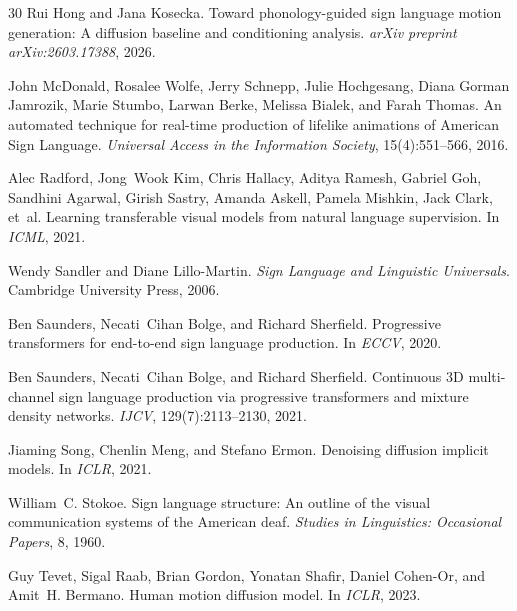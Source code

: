 \documentclass{article}
\begin{document}
\begin{thebibliography}{30}
Rui Hong and Jana Kosecka.
\newblock Toward phonology-guided sign language motion generation: A diffusion baseline and conditioning analysis.
\newblock \emph{arXiv preprint arXiv:2603.17388}, 2026.

John McDonald, Rosalee Wolfe, Jerry Schnepp, Julie Hochgesang, Diana Gorman Jamrozik, Marie Stumbo, Larwan Berke, Melissa Bialek, and Farah Thomas.
\newblock An automated technique for real-time production of lifelike animations of {A}merican {S}ign {L}anguage.
\newblock \emph{Universal Access in the Information Society}, 15(4):551--566, 2016.

Alec Radford, Jong~Wook Kim, Chris Hallacy, Aditya Ramesh, Gabriel Goh, Sandhini Agarwal, Girish Sastry, Amanda Askell, Pamela Mishkin, Jack Clark, et~al.
\newblock Learning transferable visual models from natural language supervision.
\newblock In \emph{ICML}, 2021.

Wendy Sandler and Diane Lillo-Martin.
\newblock \emph{Sign Language and Linguistic Universals}.
\newblock Cambridge University Press, 2006.

Ben Saunders, Necati~Cihan Bolge, and Richard Sherfield.
\newblock Progressive transformers for end-to-end sign language production.
\newblock In \emph{ECCV}, 2020.

Ben Saunders, Necati~Cihan Bolge, and Richard Sherfield.
\newblock Continuous {3D} multi-channel sign language production via progressive transformers and mixture density networks.
\newblock \emph{IJCV}, 129(7):2113--2130, 2021.

Jiaming Song, Chenlin Meng, and Stefano Ermon.
\newblock Denoising diffusion implicit models.
\newblock In \emph{ICLR}, 2021.

William~C. Stokoe.
\newblock Sign language structure: An outline of the visual communication systems of the {A}merican deaf.
\newblock \emph{Studies in Linguistics: Occasional Papers}, 8, 1960.

Guy Tevet, Sigal Raab, Brian Gordon, Yonatan Shafir, Daniel Cohen-Or, and Amit~H. Bermano.
\newblock Human motion diffusion model.
\newblock In \emph{ICLR}, 2023.


\end{thebibliography}
\end{document}

